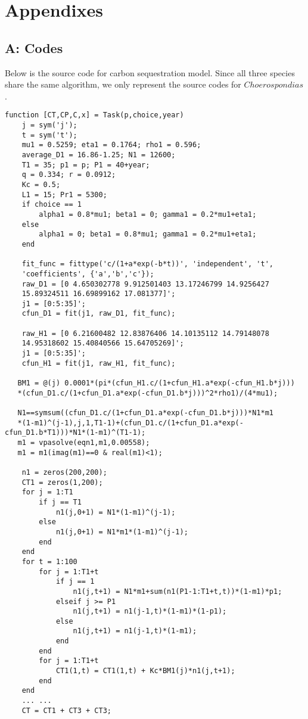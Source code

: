 
\newpage

\section{Appendixes}

\subsection{A: Codes}
Below is the source code for carbon sequestration model. Since all three species share the same algorithm, we only represent the source codes for $Choerospondias$.
\begin{lstlisting}
function [CT,CP,C,x] = Task(p,choice,year)
    j = sym('j');
    t = sym('t');
    mu1 = 0.5259; eta1 = 0.1764; rho1 = 0.596;
    average_D1 = 16.86-1.25; N1 = 12600;
    T1 = 35; p1 = p; P1 = 40+year;
    q = 0.334; r = 0.0912;
    Kc = 0.5;
    L1 = 15; Pr1 = 5300;
    if choice == 1
        alpha1 = 0.8*mu1; beta1 = 0; gamma1 = 0.2*mu1+eta1;
    else
        alpha1 = 0; beta1 = 0.8*mu1; gamma1 = 0.2*mu1+eta1;
    end
    
    fit_func = fittype('c/(1+a*exp(-b*t))', 'independent', 't',
    'coefficients', {'a','b','c'});
    raw_D1 = [0 4.650302778 9.912501403 13.17246799 14.9256427
    15.89324511 16.69899162 17.081377]';
    j1 = [0:5:35]';
    cfun_D1 = fit(j1, raw_D1, fit_func);

    raw_H1 = [0 6.21600482 12.83876406 14.10135112 14.79148078
    14.95318602 15.40840566 15.64705269]';
    j1 = [0:5:35]';
    cfun_H1 = fit(j1, raw_H1, fit_func);

   BM1 = @(j) 0.0001*(pi*(cfun_H1.c/(1+cfun_H1.a*exp(-cfun_H1.b*j)))
   *(cfun_D1.c/(1+cfun_D1.a*exp(-cfun_D1.b*j)))^2*rho1)/(4*mu1);

   N1==symsum((cfun_D1.c/(1+cfun_D1.a*exp(-cfun_D1.b*j)))*N1*m1
   *(1-m1)^(j-1),j,1,T1-1)+(cfun_D1.c/(1+cfun_D1.a*exp(-cfun_D1.b*T1)))*N1*(1-m1)^(T1-1);
   m1 = vpasolve(eqn1,m1,0.00558);
   m1 = m1(imag(m1)==0 & real(m1)<1);

    n1 = zeros(200,200);
    CT1 = zeros(1,200);
    for j = 1:T1
        if j == T1
            n1(j,0+1) = N1*(1-m1)^(j-1);
        else
            n1(j,0+1) = N1*m1*(1-m1)^(j-1);
        end
    end
    for t = 1:100
        for j = 1:T1+t
            if j == 1
                n1(j,t+1) = N1*m1+sum(n1(P1-1:T1+t,t))*(1-m1)*p1;
            elseif j >= P1
                n1(j,t+1) = n1(j-1,t)*(1-m1)*(1-p1);
            else
                n1(j,t+1) = n1(j-1,t)*(1-m1);
            end
        end
        for j = 1:T1+t
            CT1(1,t) = CT1(1,t) + Kc*BM1(j)*n1(j,t+1);
        end
    end
    ... ...
    CT = CT1 + CT3 + CT3;
    

\end{lstlisting}
